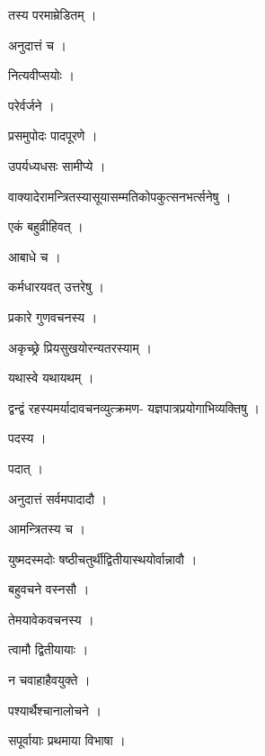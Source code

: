 \documentclass[10pt, openany]{book}
\begin{document}
\noindent तस्य परमाम्रेडितम् ।

\noindent अनुदात्तं च ।

\noindent नित्यवीप्सयोः ।

\noindent परेर्वर्जने ।

\noindent प्रसमुपोदः पादपूरणे ।

\noindent उपर्यध्यधसः सामीप्ये ।

\noindent वाक्यादेरामन्त्रितस्यासूयासम्मतिकोपकुत्सनभर्त्सनेषु ।

\noindent एकं बहुव्रीहिवत् ।

\noindent आबाधे च ।

\noindent कर्मधारयवत् उत्तरेषु ।

\noindent प्रकारे गुणवचनस्य ।

\noindent अकृच्छ्रे प्रियसुखयोरन्यतरस्याम् ।

\noindent यथास्वे यथायथम् ।

\noindent द्वन्द्वं रहस्यमर्यादावचनव्युत्क्रमण- यज्ञपात्रप्रयोगाभिव्यक्तिषु ।

\noindent पदस्य ।

\noindent पदात् ।

\noindent अनुदात्तं सर्वमपादादौ ।

\noindent आमन्त्रितस्य च ।

\noindent युष्मदस्मदोः षष्ठीचतुर्थीद्वितीयास्थयोर्वान्नावौ ।

\noindent बहुवचने वस्नसौ ।

\noindent तेमयावेकवचनस्य ।

\noindent त्वामौ द्वितीयायाः ।

\noindent न चवाहाहैवयुक्ते ।

\noindent पश्यार्थैश्चानालोचने ।

\noindent सपूर्वायाः प्रथमाया विभाषा ।
\end{document}

